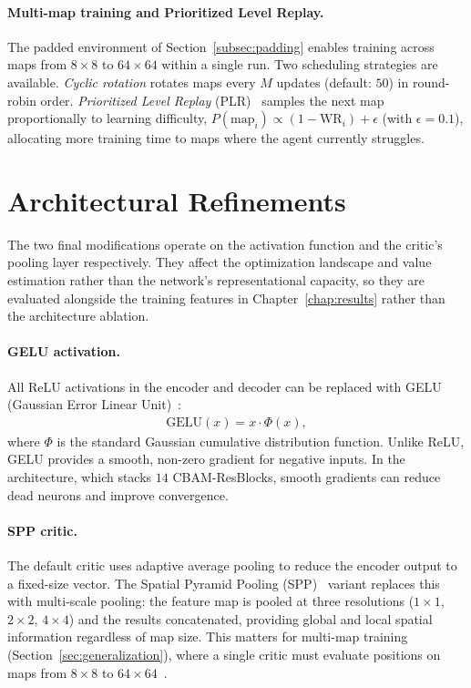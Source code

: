 \paragraph{Multi-map training and Prioritized Level Replay.}

The padded environment of Section~\ref{subsec:padding} enables training across maps from $8{\times}8$ to $64{\times}64$ within a single run. Two scheduling strategies are available. \emph{Cyclic rotation} rotates maps every $M$ updates (default: $50$) in round-robin order. \emph{Prioritized Level Replay} (PLR)~\cite{jiangPrioritizedLevelReplay2021} samples the next map proportionally to learning difficulty, $P(\text{map}_i) \propto (1 - \mathrm{WR}_i) + \epsilon$ (with $\epsilon = 0.1$), allocating more training time to maps where the agent currently struggles.

\section{Architectural Refinements}
\label{sec:arch-enhancements}

The two final modifications operate on the activation function and the critic's pooling layer respectively. They affect the optimization landscape and value estimation rather than the network's representational capacity, so they are evaluated alongside the training features in Chapter~\ref{chap:results} rather than the architecture ablation.

\paragraph{GELU activation.}

All ReLU activations in the encoder and decoder can be replaced with GELU (Gaussian Error Linear Unit)~\cite{hendrycksGaussianErrorLinear2016}:
\begin{align}
\text{GELU}(x) = x \cdot \Phi(x),
\end{align}
where $\Phi$ is the standard Gaussian cumulative distribution function. Unlike ReLU, GELU provides a smooth, non-zero gradient for negative inputs. In the  architecture, which stacks $14$ CBAM-ResBlocks, smooth gradients can reduce dead neurons and improve convergence.

\paragraph{SPP critic.}

The default critic uses adaptive average pooling to reduce the encoder output to a fixed-size vector. The Spatial Pyramid Pooling (SPP)~\cite{heSpatialPyramidPooling2015} variant replaces this with multi-scale pooling: the feature map is pooled at three resolutions ($1{\times}1$, $2{\times}2$, $4{\times}4$) and the results concatenated, providing global and local spatial information regardless of map size. This matters for multi-map training (Section~\ref{sec:generalization}), where a single critic must evaluate positions on maps from $8{\times}8$ to $64{\times}64$~\cite{lemosEnhancingDeepReinforcement2025}.